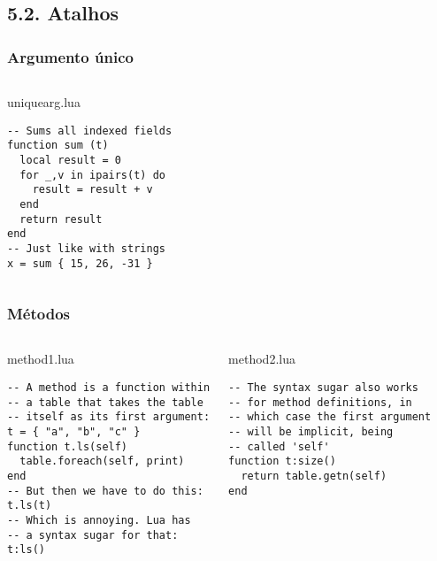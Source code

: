 \documentclass[brazil]{beamer}
\begin{document}
\subsection{5.2. Atalhos}
\begin{frame}[fragile]
  \frametitle{Argumento único}
  \pause
  \begin{columns}
      \begin{block}{uniquearg.lua}
        \begin{lstlisting}
-- Sums all indexed fields
function sum (t)
  local result = 0
  for _,v in ipairs(t) do
    result = result + v
  end
  return result
end
-- Just like with strings
x = sum { 15, 26, -31 }
        \end{lstlisting}
      \end{block}
  \end{columns}
\end{frame}
\begin{frame}[fragile]
  \frametitle{Métodos}
  \pause
  \begin{columns}
      \begin{block}{method1.lua}
        \begin{lstlisting}
-- A method is a function within
-- a table that takes the table
-- itself as its first argument:
t = { "a", "b", "c" }
function t.ls(self)
  table.foreach(self, print)
end
-- But then we have to do this:
t.ls(t)
-- Which is annoying. Lua has
-- a syntax sugar for that:
t:ls()
        \end{lstlisting}
      \end{block}
    \pause
      \begin{block}{method2.lua}
        \begin{lstlisting}
-- The syntax sugar also works
-- for method definitions, in
-- which case the first argument
-- will be implicit, being
-- called 'self'
function t:size()
  return table.getn(self)
end
        \end{lstlisting}
      \end{block}
  \end{columns}
\end{frame}
\end{document}
